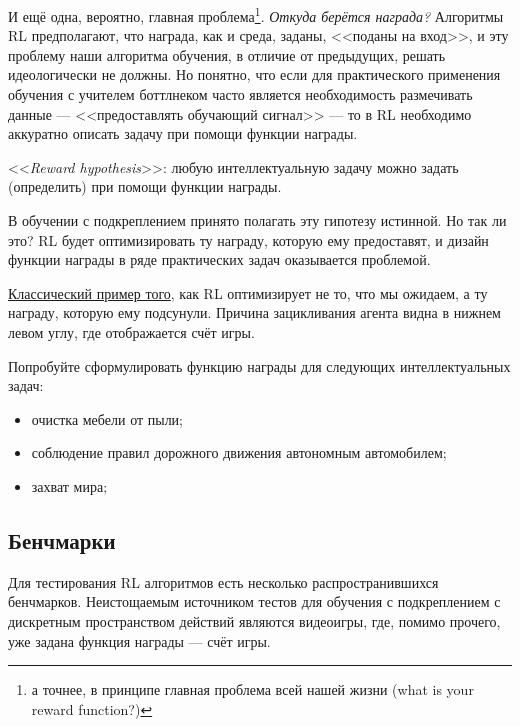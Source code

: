 И ещё одна, вероятно, главная проблема\footnote{а точнее, в принципе главная проблема всей нашей жизни (what is your reward function?)}. \emph{Откуда берётся награда?} Алгоритмы RL предполагают, что награда, как и среда, заданы, <<поданы на вход>>, и эту проблему наши алгоритма обучения, в отличие от предыдущих, решать идеологически не должны. Но понятно, что если для практического применения обучения с учителем боттлнеком часто является необходимость размечивать данные --- <<предоставлять обучающий сигнал>> --- то в RL необходимо аккуратно описать задачу при помощи функции награды.

\begin{definition}
<<\emph{Reward hypothesis}>>: любую интеллектуальную задачу можно задать (определить) при помощи функции награды.
\end{definition}

В обучении с подкреплением принято полагать эту гипотезу истинной. Но так ли это? RL будет оптимизировать ту награду, которую ему предоставят, и дизайн функции награды в ряде практических задач оказывается проблемой.

\begin{example}
\href{https://www.youtube.com/watch?v=tlOIHko8ySg}{Классический пример того}, как RL оптимизирует не то, что мы ожидаем, а ту награду, которую ему подсунули. Причина зацикливания агента видна в нижнем левом углу, где отображается счёт игры.
\end{example}

\begin{example}
Попробуйте сформулировать функцию награды для следующих интеллектуальных задач:
\begin{itemize}
    \item очистка мебели от пыли;
    \item соблюдение правил дорожного движения автономным автомобилем;
    \item захват мира;
\end{itemize}
\end{example}

\subsection{Бенчмарки}

Для тестирования RL алгоритмов есть несколько распространившихся бенчмарков. Неистощаемым источником тестов для обучения с подкреплением с дискретным пространством действий являются видеоигры, где, помимо прочего, уже задана функция награды --- счёт игры.

